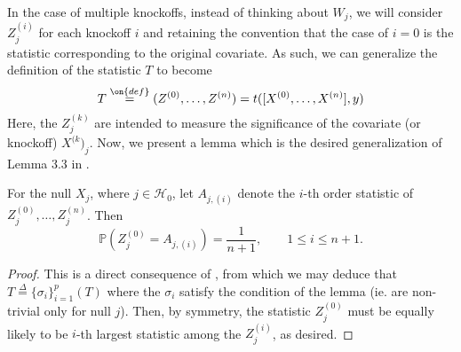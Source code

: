 \documentclass[12pt,reqno]{amsart}
\numberwithin{equation}{section}
\begin{document}
In the case of multiple knockoffs, instead of thinking about $W_j$, we will consider $Z_j^{(i)}$ for each knockoff $i$ and retaining the convention that the case of $i = 0$ is the statistic corresponding to the original covariate. As such, we can generalize the definition of the statistic $T$ to become
\begin{equation}
T \overset{\on{def}}{=} (Z^{(0)},\ldots, Z^{(n)}) = t([X^{(0)}, \ldots, X^{(n)}], y)
\end{equation}
Here, the $Z^{(k)}_j$ are intended to measure the significance of the covariate (or knockoff) $X^{(k})_j$. Now, we present a lemma which is the desired generalization of Lemma 3.3 in \cite{panning}.
\begin{lem}
For the null $X_j$, where $j \in \mathcal{H}_0$, let $A_{j, (i)}$ denote the $i$-th order statistic of $Z_j^{(0)}, \ldots, Z_j^{(n)}$. Then
\begin{equation}
\mathbb{P}\left(Z_j^{(0)} = A_{j, (i)} \right) = \frac{1}{n+1}, \qquad 1 \leq i \leq n + 1.
\end{equation}
\end{lem}
\begin{proof}
This is a direct consequence of \hyperref[lemma3.2]{}, from which we may deduce that $T \overset{\Delta}{=} \{ \sigma_i \}_{i=1}^p \left( T \right)$ where the $\sigma_i$ satisfy the condition of the lemma (ie. are non-trivial only for null $j$). Then, by symmetry, the statistic $Z_j^{(0)}$ must be equally likely to be $i$-th largest statistic among the $Z_j^{(i)}$, as desired.
\end{proof}




\end{document}
